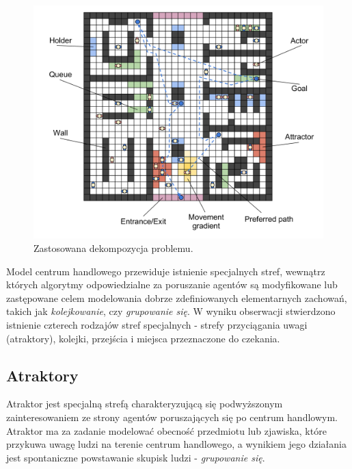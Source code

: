\documentclass[a4paper, 12pt]{article}
\begin{document}
    \begin{figure}[H]
        \centering
        \includegraphics[scale=0.3]{./img/Overview.pdf}
        \caption{Zastosowana dekompozycja problemu.}
        \label{fig:overview}
    \end{figure}

Model centrum handlowego przewiduje istnienie specjalnych stref, wewnątrz których algorytmy odpowiedzialne za poruszanie agentów są modyfikowane lub zastępowane celem modelowania dobrze zdefiniowanych elementarnych zachowań, takich jak \emph{kolejkowanie}, czy \emph{grupowanie się}. W wyniku obserwacji stwierdzono istnienie czterech rodzajów stref specjalnych - strefy przyciągania uwagi (atraktory), kolejki, przejścia i miejsca przeznaczone do czekania.

    \subsection{Atraktory}
    \label{sec:attractors}

Atraktor jest specjalną strefą charakteryzującą się podwyższonym zainteresowaniem ze strony agentów poruszających się po centrum handlowym. Atraktor ma za zadanie modelować obecność przedmiotu lub zjawiska, które przykuwa uwagę ludzi na terenie centrum handlowego, a wynikiem jego działania jest spontaniczne powstawanie skupisk ludzi - \emph{grupowanie się}.
\end{document}
